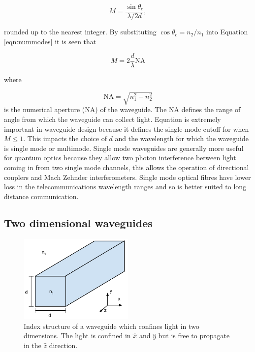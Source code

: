\begin{equation}\label{eqn:nummodes} M = \frac{\sin \theta_c}{ \lambda / 2d},
\end{equation}

rounded up to the nearest integer. By substituting $\cos \theta_c = n_2/n_1$
into Equation \ref{eqn:nummodes} it is seen that

\begin{equation}\label{eqn:nummodes} M = 2\frac{d}{\lambda} \mathrm{NA}
\end{equation}

where

\begin{equation} \mathrm{NA} = \sqrt{n_1^2-n_2^2} \end{equation} is the
numerical aperture (NA) of the waveguide. The $\mathrm{NA}$ defines the range of
angle from which the waveguide can collect light. Equation \label{eqn:nummodes}
is extremely important in waveguide design because it defines the single-mode
cutoff for when $M \leq 1$. This impacts the choice of $d$ and the wavelength
for which the waveguide is single mode or multimode. Single mode waveguides are
generally more useful for quantum optics because they allow two photon
interference between light coming in from two single mode channels, this allows
the operation of directional couplers and Mach Zehnder interferometers. Single
mode optical fibres have lower loss in the telecommunications wavelength ranges
and so is better suited to long distance communication.

\subsection{Two dimensional waveguides}

\begin{figure}[h!] \begin{center}
\includegraphics[width=0.5\textwidth]{images/2d_waveguide.pdf} \end{center}
\caption{
Index structure of a waveguide which confines light in two dimensions.
The light is confined in $\hat{x}$ and $\hat{y}$ but is free to propagate in the
$\hat{z}$ direction.
} \label{fig:2dwg} \end{figure}

